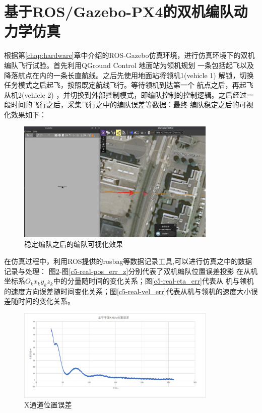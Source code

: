 \section{基于ROS/Gazebo-PX4的双机编队动力学仿真}
根据第\ref{chap:hardware}章中介绍的ROS-Gazebo仿真环境，进行仿真环境下的双机编队飞行试验。首先利用QGround Control 地面站为领机规划
一条包括起飞以及降落航点在内的一条长直航线。之后先使用地面站将领机1(vehicle 1)
解锁，切换任务模式之后起飞，按照既定航线飞行。等待领机到达第一个
航点之后，再起飞从机2(vehicle 2)
，并切换到外部控制模式，即编队控制的控制逻辑。之后经过一段时间的飞行之后，采集飞行之中的编队误差等数据：最终
编队稳定之后的可视化效果如下：
\begin{figure}[H]
    \centering
    \includegraphics[width=0.85\textwidth]{figures/c5/c5-real-overview}
    \caption{稳定编队之后的编队可视化效果}\label{c5-real-overview}
\end{figure}
在仿真过程中，利用ROS提供的rosbag等数据记录工具,可以进行仿真之中的数据记录与处理：
图\ref{c5-real-pos_err_x}-图\ref{c5-real-pos_err_z}分别代表了双机编队位置误差投影
在从机坐标系$O_kx_ky_kz_k$中的分量随时间的变化关系；图\ref{c5-real-eta_err}代表从
机与领机的速度方向误差随时间变化关系；图\ref{c5-real-vel_err}代表从机与领机的速度大小误差随时间的变化关系。
\begin{figure}[H]
    \centering
    \includegraphics[width=0.85\textwidth]{figures/c5/c5-real-pos_err_x}
    \caption{X通道位置误差}\label{c5-real-pos_err_x}
\end{figure}
